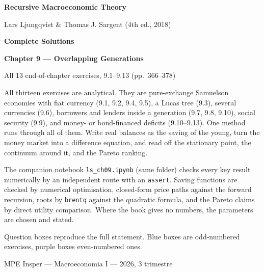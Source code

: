 \documentclass[12pt, letterpaper]{article}
\begin{document}
\begin{titlepage}
\centering
\vspace*{2.5cm}
{\Huge\bfseries\color{darkblue} Recursive Macroeconomic Theory\par}
\vspace{6pt}
{\large Lars Ljungqvist \& Thomas J. Sargent (4th ed., 2018)\par}
\vspace{1.4cm}
{\LARGE\bfseries Complete Solutions\par}
\vspace{6pt}
{\LARGE\bfseries Chapter 9 --- Overlapping Generations\par}
\vspace{1.2cm}
{\large All 13 end-of-chapter exercises, 9.1--9.13 (pp.~366--378)\par}
\vspace{2cm}

\begin{tcolorbox}[theorybox,title={What is in this file},width=0.86\textwidth]
\small
All thirteen exercises are analytical. They are pure-exchange Samuelson economies with fiat currency
(9.1, 9.2, 9.4, 9.5), a Lucas tree (9.3), several currencies (9.6), borrowers and lenders inside a
generation (9.7, 9.8, 9.10), social security (9.9), and money- or bond-financed deficits (9.10--9.13).
One method runs through all of them. Write real balances as the saving of the young, turn the money
market into a difference equation, and read off the stationary point, the continuum around it, and
the Pareto ranking.

\smallskip
The companion notebook \texttt{ls\_ch09.ipynb} (same folder) checks every key result numerically by
an independent route with an \texttt{assert}. Saving functions are checked by numerical optimisation,
closed-form price paths against the forward recursion, roots by \texttt{brentq} against the quadratic
formula, and the Pareto claims by direct utility comparison. Where the book gives no numbers, the
parameters are chosen and stated.

\smallskip
Question boxes reproduce the full statement. Blue boxes are odd-numbered exercises, purple boxes
even-numbered ones.
\end{tcolorbox}

\vfill
{\small MPE Insper --- Macroeconomia I --- 2026, 3\textordmasculine{} trimestre\par}
\end{titlepage}
\end{document}
